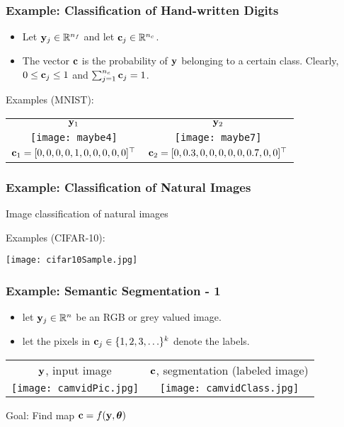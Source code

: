 \documentclass[12pt,fleqn]{beamer}
\begin{document}
\begin{frame}\frametitle{Example: Classification of Hand-written Digits }

\begin{itemize}
\item
Let ${\bf y}_j \in \mathbb{R}^{n_f}$ and let ${\bf c}_j\in \mathbb{R}^{n_c}$.
\item
The vector ${\bf c}$ is the probability of ${\bf y}$ belonging to a certain class. Clearly, $0\le {\bf c}_j \le 1$ and $\sum_{j=1}^{n_c} {\bf c}_j = 1$.
\end{itemize}

\vfill

Examples (MNIST):
\begin{center}
	\begin{tabular}{cc}
		${\bf y}_1$ & ${\bf y}_2$\\
	\texttt{[image: maybe4]} &
	\texttt{[image: maybe7]} \\
	${\bf c}_1 = [0, 0, 0, 0, 1, 0, 0, 0, 0, 0]^\top$ &
	${\bf c}_2 = [0, 0.3, 0, 0, 0, 0, 0, 0.7, 0, 0]^\top$
	\end{tabular}
	
\end{center}


\end{frame} 
\begin{frame}\frametitle{Example: Classification of Natural Images}

Image classification of natural images
\bigskip

Examples (CIFAR-10):
\begin{center}
\texttt{[image: cifar10Sample.jpg]} 
\end{center}

\end{frame}
 
\begin{frame}\frametitle{Example:  Semantic Segmentation - 1}

\begin{itemize}
	\item
	let ${\bf y}_j \in \mathbb{R}^n$ be an RGB or grey valued image.
	\item let the pixels in ${\bf c}_j\in \{1,2,3,\ldots \}^k$ denote the labels.
\end{itemize}

\begin{center}
	\begin{tabular}{cc}
		${\bf y}$, input image & ${\bf c}$, segmentation (labeled image)\\
	\texttt{[image: camvidPic.jpg]} &
	\texttt{[image: camvidClass.jpg]} 
	\end{tabular}

	Goal: Find map ${\bf c}  = f({\bf y},{\boldsymbol \theta})$ 

\end{center}


\end{frame}
\end{document}
